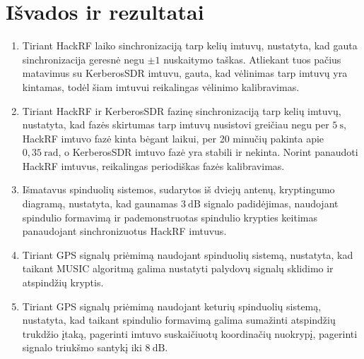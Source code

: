 \documentclass[../gnss_interference_resistant_thesis.tex]{subfiles}
\begin{document}
\section*{Išvados ir rezultatai}

\begin{enumerate}
    \item Tiriant HackRF laiko sinchronizaciją tarp kelių imtuvų, nustatyta, kad gauta sin\-chro\-ni\-za\-ci\-ja
          geresnė negu $\pm 1$ nuskaitymo taškas. Atliekant tuos pačius matavimus su KerberosSDR imtuvu,
          gauta, kad vėlinimas tarp imtuvų yra kintamas, todėl šiam imtuvui reikalingas vėlinimo kalibravimas.
    \item Tiriant HackRF ir KerberosSDR fazinę sinchronizaciją tarp kelių imtuvų, nustatyta, kad fazės skirtumas
          tarp imtuvų nusistovi greičiau negu per $5\ \mathrm{s}$, HackRF imtuvo fazė kinta bėgant laikui, per
          20 minučių pakinta apie $0,35\ \mathrm{rad}$, o KerberosSDR imtuvo fazė yra stabili ir nekinta.
          Norint panaudoti HackRF imtuvus, reikalingas periodiškas fazės kalibravimas.
    \item Išmatavus spinduolių sistemos, sudarytos iš dviejų antenų, kryptingumo diagramą, nu\-sta\-ty\-ta, kad gaunamas $3\ \mathrm{dB}$
          signalo padidėjimas, naudojant spindulio formavimą ir pa\-de\-mon\-struo\-tas spindulio krypties keitimas
          panaudojant sinchronizuotus HackRF imtuvus.
    \item Tiriant GPS signalų priėmimą naudojant spinduolių sistemą, nustatyta, kad taikant MUSIC algoritmą
          galima nustatyti palydovų signalų sklidimo ir atspindžių kryptis.
    \item Tiriant GPS signalų priėmimą naudojant keturių spinduolių sistemą, nustatyta, kad taikant spindulio formavimą
          galima sumažinti atspindžių trukdžio įtaką, pagerinti imtuvo suskaičiuotų koordinačių nuokrypį, pagerinti
          signalo triukšmo santykį iki $8\ \mathrm{dB}$.
\end{enumerate}
\end{document}
